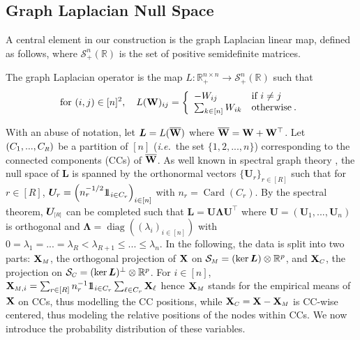 \subsection{Graph Laplacian Null Space}\label{sec:laplacian_prop}
A central element in our construction is the graph Laplacian linear map, defined as follows, where $\mathcal{S}^n_+(\mathbb{R})$ is the set of positive semidefinite matrices.
\begin{definition}\label{graph_laplacian}
The graph Laplacian operator is the map $L \colon \mathbb{R}_+^{n \times n} \to \mathcal{S}^n_+(\mathbb{R})$ such that
$$\text{for } (i,j) \in [n]^2, \quad L(\mathbf{W})_{ij} = \left\{
\begin{array}{ll}
    - W_{ij} & \text{if } i \neq j \\
    \sum_{k \in [n]} W_{ik} & \text{otherwise} \:.
\end{array} 
\right. $$
\end{definition}
With an abuse of notation, let $\bm{L} = L(\overline{\mathbf{W}})$ where $\overline{\mathbf{W}} = \mathbf{W} + \mathbf{W}^\top$. Let $(C_1,...,C_{\scaleto{R}{4pt}})$ be a partition of $[n]$ (\textit{i.e.}\ the set $\{1,2,...,n\}$) corresponding to the connected components (CCs) of $\overline{\mathbf{W}}$. As well known in spectral graph theory \cite{Chung97}, the null space of $\bm{L}$ is spanned by the orthonormal vectors $\{\bm{U}_{r}\}_{r \in [R]}$ such that for $r \in [R]$,
$\bm{U}_{r} = \left(n_r^{-1/2} 1\!\!1_{i \in C_r}\right)_{i \in [n]}$ with $n_r = \operatorname{Card}(C_r)$. By the spectral theorem, $\bm{U}_{\scaleto{[R]}{5pt}}$ can be completed such that $\bm{L} = \bm{U \Lambda U^\top}$ where $\bm{U} = (\bm{U}_1, ..., \bm{U}_n)$ is orthogonal and $\bm{\Lambda} = \operatorname{diag}((\lambda_i)_{i \in [n]})$ with $0 = \lambda_1 = ... = \lambda_R < \lambda_{R+1} \leq ... \leq \lambda_n$. In the following, the data is split into two parts: $\X_{\scaleto{M}{4pt}}$, the orthogonal projection of $\mathbf{X}$ on $\mathcal{S}_{\scaleto{M}{4pt}} = (\ker \bm{L}) \otimes \mathbb{R}^p$, and $\X_{\scaleto{C}{4pt}}$, the projection on $\mathcal{S}_{\scaleto{C}{4pt}} = (\ker \bm{L})^{\perp} \otimes \mathbb{R}^p$. For $i \in [n]$, $\X_{\scaleto{M}{4pt},i} = \sum_{r \in [R]} n_r^{-1} \ind_{i \in C_r}\sum_{\ell \in C_r} \X_{\ell} $ hence $\X_{\scaleto{M}{4pt}}$ stands for the empirical means of $\mathbf{X}$ on CCs, thus modelling the CC positions, while $\X_{\scaleto{C}{4pt}} = \X - \X_{\scaleto{M}{4pt}}$ is CC-wise centered, thus modeling the relative positions of the nodes within CCs. We now introduce the probability distribution of these variables.

